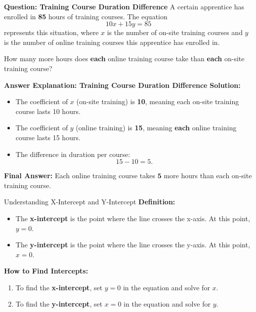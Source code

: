 \documentclass{beamer}
\begin{document}
\begin{frame}{\textbf{Question: Training Course Duration Difference}}
    A certain apprentice has enrolled in \textbf{85} hours of training courses. The equation
    \[
    10x + 15y = 85
    \]
    represents this situation, where \( x \) is the number of on-site training courses and \( y \) is the number of online training courses this apprentice has enrolled in.

    \vspace{0.3cm}
    How many more hours does \textbf{each} online training course take than \textbf{each} on-site training course?
\end{frame}

\begin{frame}{\textbf{Answer Explanation: Training Course Duration Difference}}
    \textbf{Solution:}
    \begin{itemize}
        \item The coefficient of \( x \) (on-site training) is \textbf{10}, meaning each on-site training course lasts 10 hours.
        \item The coefficient of \( y \) (online training) is \textbf{15}, meaning \textbf{each} online training course lasts 15 hours.
        \item The difference in duration per course:
        \[
        15 - 10 = 5.
        \]
    \end{itemize}

    \textbf{Final Answer:} Each online training course takes \(\mathbf{5}\) more hours than each on-site training course.
\end{frame}



\begin{frame}{Understanding X-Intercept and Y-Intercept}
    \textbf{Definition:}
    \begin{itemize}
        \item The \textbf{x-intercept} is the point where the line crosses the x-axis. At this point, \( y = 0 \).
        \item The \textbf{y-intercept} is the point where the line crosses the y-axis. At this point, \( x = 0 \).
    \end{itemize}

    \vspace{0.5cm}
    \textbf{How to Find Intercepts:}
    \begin{enumerate}
        \item To find the \textbf{x-intercept}, set \( y = 0 \) in the equation and solve for \( x \).
        \item To find the \textbf{y-intercept}, set \( x = 0 \) in the equation and solve for \( y \).
    \end{enumerate}

    \vspace{0.5cm}

\end{frame}
\end{document}
